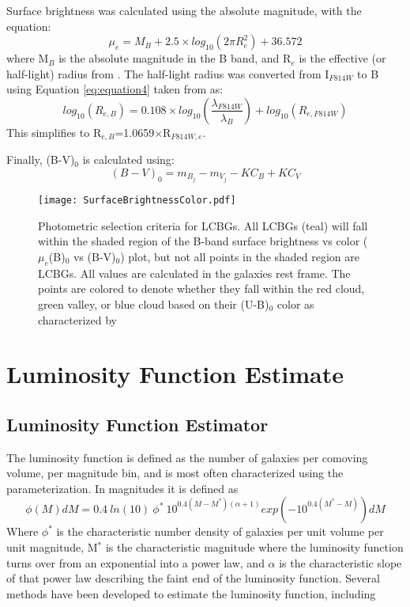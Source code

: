 \documentclass[manuscript]{aastex61}
\begin{document}
Surface brightness was calculated using the absolute magnitude, with the equation:
\begin{equation}
\mu_{e}=M_{B}+2.5\times log_{10}(2\pi R_{e}^{2})+36.572
\label{eq:equation 3}
\end{equation}
where M$_{B}$ is the absolute magnitude in the B band, and R$_{e}$ is the effective (or half-light) radius from \citet{2009A&A...503..379T}. The half-light radius was converted from I$_{F814W}$ to B using Equation \ref{eq:equation4} taken from \citet{2015MNRAS.447.1014D} as:
\begin{equation}
log_{10}(R_{e,B})=0.108\times log_{10}\left(\frac{\lambda_{F814W}}{\lambda_{B}}\right)+log_{10}(R_{e,F814W})
\label{eq:equation4}
\end{equation}
This simplifies to R$_{e,B}$=1.0659$\times$R$_{F814W,e}$. 

Finally, (B-V)$_{0}$ is calculated using:
\begin{equation}
(B-V)_{0}=m_{B_{j}}-m_{V_{j}}-KC_{B}+KC_{V}
\label{eq:equation 5}
\end{equation}
\begin{figure*}
\texttt{[image: SurfaceBrightnessColor.pdf]}
\caption{Photometric selection criteria for LCBGs. All LCBGs (teal) will fall within the shaded region of the B-band surface brightness vs color ($\mu_{e}$(B)$_{0}$ vs (B-V)$_{0}$) plot, but not all points in the shaded region are LCBGs. All values are calculated in the galaxies rest frame. The points are colored to denote whether they fall within the red cloud, green valley, or blue cloud based on their (U-B)$_{0}$ color as characterized by \citet{2006ApJ...647..853W}}
\end{figure*}

\section{Luminosity Function Estimate}
\label{LFE}
\subsection{Luminosity Function Estimator}
The luminosity function is defined as the number of galaxies per comoving volume, per magnitude bin, and is most often characterized using the \citet{1976ApJ...203..297S} parameterization. In magnitudes it is defined as 
\begin{equation}
\phi(M)dM=0.4~ln(10)~\phi^{*}~10^{0.4(M-M^{*})(\alpha+1)}exp(-10^{0.4(M^{*}-M)})dM
\label{eq:equation 6}
\end{equation}
Where $\phi^{*}$ is the characteristic number density of galaxies per unit volume per unit magnitude, M$^{*}$ is the characteristic magnitude where the luminosity function turns over from an exponential into a power law, and $\alpha$ is the characteristic slope of that power law describing the faint end of the luminosity function.
Several methods have been developed to estimate the luminosity function, including \citet{1968ApJ...151..393S,1971MNRAS.155...95L,1979ApJ...231..645T,1979ApJ...234..775T,1986MNRAS.223....1C,1988MNRAS.232..431E}
\end{document}
